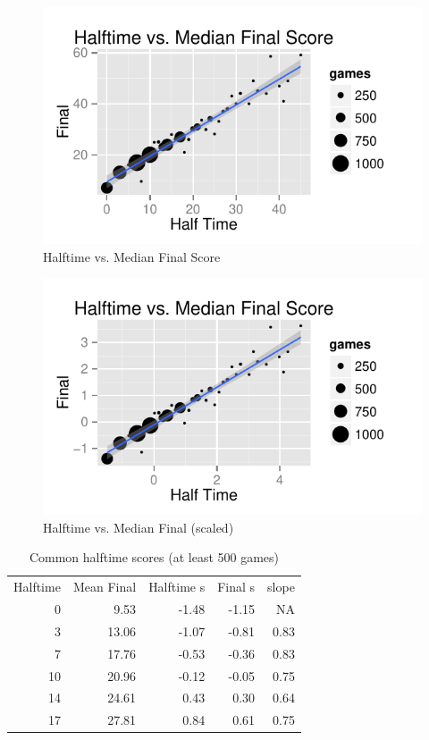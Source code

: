 \documentclass[landscape]{exam}
\begin{document}
  \begin{figure}[H]
    \centering
    \includegraphics{figures/nfl/ht_vs_median_final.pdf}
    \caption{Halftime vs. Median Final Score}
  \end{figure}

  \begin{figure}[H]
    \centering
    \includegraphics{figures/nfl/ht_vs_median_final_scaled.pdf}
    \caption{Halftime vs. Median Final (scaled)}
  \end{figure}

  \begin{table}[H]
    \centering
    \begin{tabular}{rrrrr}
      \toprule
      \midrule
      Halftime & Mean Final & Halftime s & Final s & slope\\
      0        & 9.53       & -1.48      & -1.15   & NA \\
      3        & 13.06      & -1.07      & -0.81   & 0.83 \\
      7        & 17.76      & -0.53      & -0.36   & 0.83 \\
      10       & 20.96      & -0.12      & -0.05   & 0.75 \\
      14       & 24.61      & 0.43       & 0.30    & 0.64 \\
      17       & 27.81      & 0.84       & 0.61    & 0.75 \\
      \bottomrule
    \end{tabular}
    \caption{Common halftime scores (at least 500 games)}
  \end{table}
\end{document}
